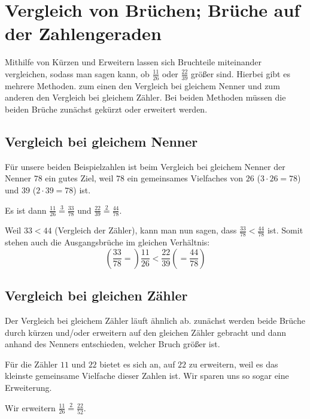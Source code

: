 \section{Vergleich von Brüchen; Brüche auf der Zahlengeraden}\vspace{-1em}
Mithilfe von Kürzen und Erweitern lassen sich Bruchteile miteinander vergleichen, sodass man sagen kann, ob $\frac{11}{26}$ oder $\frac{22}{39}$ größer sind. Hierbei gibt es mehrere Methoden. zum einen den Vergleich bei gleichem Nenner und zum anderen den Vergleich bei gleichem Zähler. Bei beiden Methoden müssen die beiden Brüche zunächst gekürzt oder erweitert werden.

\subsection{Vergleich bei gleichem Nenner}\vspace{-1em}

Für unsere beiden Beispielzahlen ist beim Vergleich bei gleichem Nenner der Nenner $78$ ein gutes Ziel, weil $78$ ein gemeinsames Vielfaches von $26$ ($3\cdot 26=78$) und $39$ ($2\cdot39=78$) ist.

Es ist dann $\frac{11}{26}\overset{3}{=}\frac{33}{78}$ und $\frac{22}{39}\overset{2}{=}\frac{44}{78}$. 

Weil $33<44$ (Vergleich der Zähler), kann man nun sagen, dass $\frac{33}{78}<\frac{44}{78}$ ist. Somit stehen auch die Ausgangsbrüche im gleichen Verhältnis: 
\begin{equation*}
	\left(\frac{33}{78}= \right) \frac{11}{26}<\frac{22}{39} \left( =\frac{44}{78}\right)
\end{equation*}

\subsection{Vergleich bei gleichen Zähler}\vspace{-1em}
Der Vergleich bei gleichem Zähler läuft ähnlich ab. zunächst werden beide Brüche durch kürzen und/oder erweitern auf den gleichen Zähler gebracht und dann anhand des Nenners entschieden, welcher Bruch größer ist.

Für die Zähler $11$ und $22$ bietet es sich an, auf $22$ zu erweitern, weil es das kleinste gemeinsame Vielfache dieser Zahlen ist. Wir sparen uns so sogar eine Erweiterung.

Wir erweitern $\frac{11}{26}\overset{2}{=}\frac{22}{52}$.

